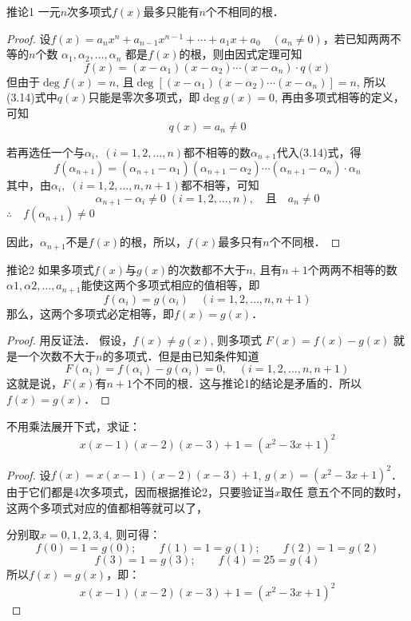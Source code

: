 \begin{blk}{推论1}
    一元$n$次多项式$f(x)$最多只能有$n$个不相同的根．
\end{blk}

\begin{proof}
设$f(x)=a_nx^n+a_{n-1}x^{n-1}+\cdots+a_1x+a_0\quad (a_n\ne 0)$，若已知两两不等的$n$个数
$\alpha_1, \alpha_2, \ldots, \alpha_n$
都是$f(x)$的根，则由因式定理可知
\begin{equation}
    f (x) = (x-\alpha_1) (x-\alpha_2)\cdots (x-\alpha_n)\cdot q(x)
\end{equation}
但由于$\deg f(x)=n$, 且$\deg[(x-\alpha_1)(x-\alpha_2)\cdots(x-\alpha_n)]=n$, 所以(3.14)式中$q(x)$只能是零次多项式，即$\deg g(x)=0$, 再由多项式相等的定义，可知
\[q (x) =a_n\ne 0\]

若再选任一个与$\alpha_i,\; (i=1, 2,\ldots,n)$都不相等的数$\alpha_{n+1}$代入(3.14)式，得
\[f(\alpha_{n+1})=(\alpha_{n+1}-\alpha_{1})(\alpha_{n+1}-\alpha_2)\cdots (\alpha_{n+1}-\alpha_n)\cdot \alpha_n\]
其中，由$\alpha_i,\; (i=1, 2,\ldots,n,n+1)$都不相等，可知
\[\alpha_{n+1}-\alpha_i\ne 0\;  (i=1, 2,\ldots,n),\quad \text{且}\quad a_n\ne 0\]
$\therefore\quad f(\alpha_{n+1}) \ne 0$

因此，$\alpha_{n+1}$不是$f(x)$的根，所以，$f(x)$最多只有$n$个不同根．
\end{proof}

\begin{blk}{推论2}
如果多项式$f(x)$与$g(x)$的次数都不大于$n$, 且有$n+1$个两两不相等的数$\alpha1,\alpha2,\ldots,a_{n+1}$能使这两个多项式相应的值相等，即   
\[f(\alpha_i)=g(\alpha_i)\quad (i=1,2,\ldots,n,n+1)\]
 那么，这两个多项式必定相等，即$f(x)=g(x)$．
\end{blk}

\begin{proof}用反证法．
假设，$f(x)\ne g(x)$, 则多项式
$F (x) =f (x) -g (x)$
就是一个次数不大于$n$的多项式．但是由已知条件知道
\[F (\alpha_i) =f (\alpha_i) -g (\alpha_i)=0,\quad  (i=1,2,\ldots,n,n+1)\]
这就是说，$F(x)$有$n+1$个不同的根．这与推论1的结论是矛盾的．所以
$f (x) =g (x)$．
\end{proof}

\begin{example}
    不用乘法展开下式，求证：
\[x(x-1) (x-2)(x-3)+1=(x^2-3x+1)^2\]
\end{example}

\begin{proof}
    设$f(x)=x(x-1)(x-2)(x-3)+1$, $
g (x) = (x^2-3x+1)^2$．
由于它们都是4次多项式，因而根据推论2，只要验证当$x$取任    
意五个不同的数时，这两个多项式对应的值都相等就可以了，

分别取$x=0, 1, 2, 3, 4$, 则可得：
\[f (0) =1=g (0);\qquad f (1) =1=g (1) ;\qquad f (2) =1=g (2)\]
\[ f (3) =1=g (3) ;\qquad f (4) =25=g (4) \]
所以$f (x) =g (x) $，即：
\[x (x-1) (x-2) (x-3)+1=(x^2-3x+1)^2\]
\end{proof}


